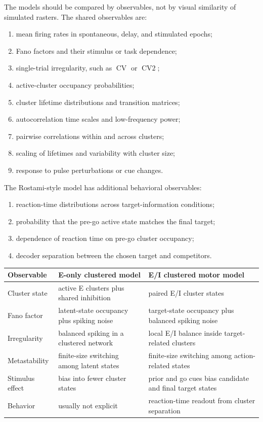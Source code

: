 The models should be compared by observables, not by visual similarity of simulated rasters. The shared observables are:
%
\begin{enumerate}[leftmargin=*]
  \item mean firing rates in spontaneous, delay, and stimulated epochs;
  \item Fano factors and their stimulus or task dependence;
  \item single-trial irregularity, such as $\operatorname{CV}$ or $\operatorname{CV2}$;
  \item active-cluster occupancy probabilities;
  \item cluster lifetime distributions and transition matrices;
  \item autocorrelation time scales and low-frequency power;
  \item pairwise correlations within and across clusters;
  \item scaling of lifetimes and variability with cluster size;
  \item response to pulse perturbations or cue changes.
\end{enumerate}

The Rostami-style model has additional behavioral observables:
%
\begin{enumerate}[leftmargin=*]
  \item reaction-time distributions across target-information conditions;
  \item probability that the pre-go active state matches the final target;
  \item dependence of reaction time on pre-go cluster occupancy;
  \item decoder separation between the chosen target and competitors.
\end{enumerate}

\begin{center}
\renewcommand{\arraystretch}{1.35}
\begin{tabularx}{\textwidth}{@{}l X X@{}}
  \toprule
  \textbf{Observable} & \textbf{E-only clustered model} & \textbf{E/I clustered motor model} \\
  \midrule
  Cluster state &
  active E clusters plus shared inhibition &
  paired E/I cluster states \\
  Fano factor &
  latent-state occupancy plus spiking noise &
  target-state occupancy plus balanced spiking noise \\
  Irregularity &
  balanced spiking in a clustered network &
  local E/I balance inside target-related clusters \\
  Metastability &
  finite-size switching among latent states &
  finite-size switching among action-related states \\
  Stimulus effect &
  bias into fewer cluster states &
  prior and go cues bias candidate and final target states \\
  Behavior &
  usually not explicit &
  reaction-time readout from cluster separation \\
  \bottomrule
\end{tabularx}
\end{center}

